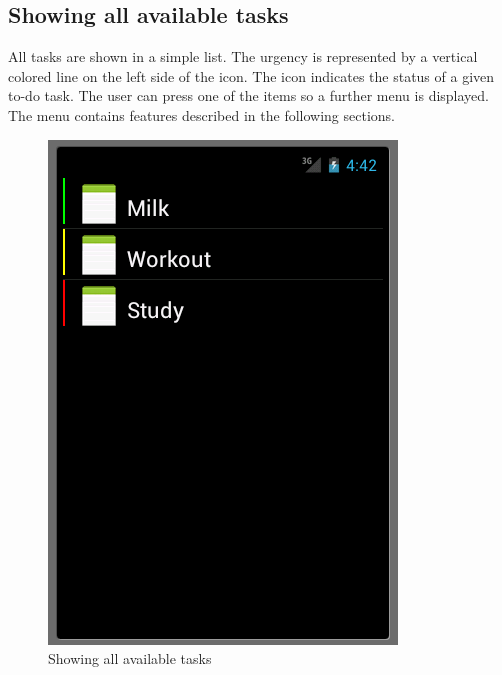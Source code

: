 \subsection{Showing all available tasks}
All tasks are shown in a simple list. The urgency is represented by a
vertical colored line on the left side of the icon. The icon indicates the status of a
given to-do task. The user can press one of the items so a further menu is
displayed. The menu contains features described in the following sections.
 \begin{figure}[h]
  \caption{Showing all available tasks}
  \center
  	\includegraphics[scale=0.25]{../resources/show-all-tasks.png}
\end{figure}


